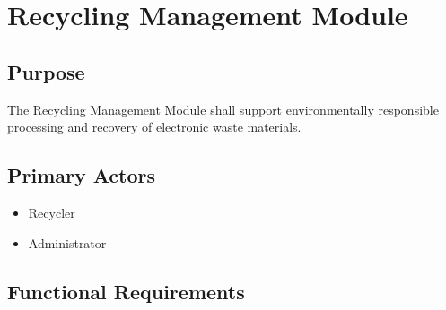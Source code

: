 \section{Recycling Management Module}
\label{sec:recycling}

\subsection{Purpose}

The Recycling Management Module shall support environmentally
responsible processing and recovery of electronic waste materials.

\subsection{Primary Actors}

\begin{itemize}
\item Recycler
\item Administrator
\end{itemize}

\subsection{Functional Requirements}

